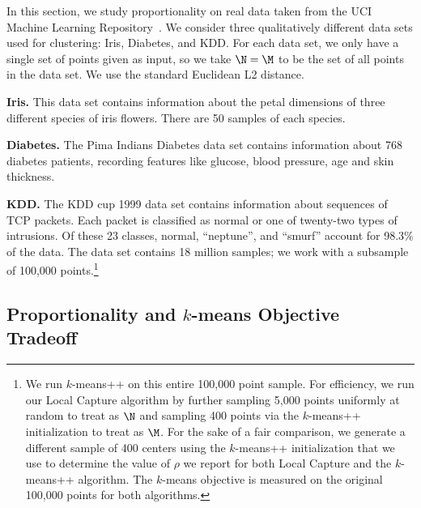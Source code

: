 In this section, we study proportionality on real data taken from the UCI Machine Learning Repository~\cite{UCI}. We consider three qualitatively different data sets used for clustering: Iris, Diabetes, and KDD. For each data set, we only have a single set of points given as input, so we take $\N = \M$ to be the set of all points in the data set. We use the standard Euclidean L2 distance.

\textbf{Iris.} This data set contains information about the petal dimensions of three different species of iris flowers. There are 50 samples of each species.

\textbf{Diabetes.} The Pima Indians Diabetes data set contains information about 768 diabetes patients, recording features like glucose, blood pressure, age and skin thickness. 

\textbf{KDD.} The KDD cup 1999 data set contains information about sequences of TCP packets. Each packet is classified as normal or one of twenty-two types of intrusions. Of these 23 classes, normal, ``neptune'', and ``smurf'' account for 98.3$\%$ of the data. The data set contains 18 million samples; we work with a subsample of 100,000 points.\footnote{We run $k$-means++ on this entire 100,000 point sample. For efficiency, we run our Local Capture algorithm by further sampling 5,000 points uniformly at random to treat as $\N$ and sampling 400 points via the $k$-means++ initialization to treat as $\M$. For the sake of a fair comparison, we generate a different sample of 400 centers using the $k$-means++ initialization that we use to determine the value of $\rho$ we report for both Local Capture and the $k$-means++ algorithm. The $k$-means objective is measured on the original 100,000 points for both algorithms.}%

\subsection{Proportionality and $k$-means Objective Tradeoff}

